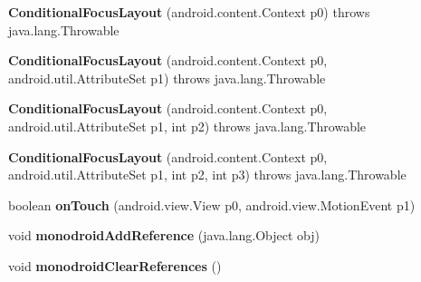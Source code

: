 \begin{DoxyCompactItemize}
\item 
\mbox{\label{classmd5b60ffeb829f638581ab2bb9b1a7f4f3f_1_1_conditional_focus_layout_ab571a4b93e045a68fdbd705da07026b3}} 
{\bfseries Conditional\+Focus\+Layout} (android.\+content.\+Context p0)  throws java.\+lang.\+Throwable 	
\item 
\mbox{\label{classmd5b60ffeb829f638581ab2bb9b1a7f4f3f_1_1_conditional_focus_layout_a3068fc1b02a87f447c1bdd623a7f354c}} 
{\bfseries Conditional\+Focus\+Layout} (android.\+content.\+Context p0, android.\+util.\+Attribute\+Set p1)  throws java.\+lang.\+Throwable 	
\item 
\mbox{\label{classmd5b60ffeb829f638581ab2bb9b1a7f4f3f_1_1_conditional_focus_layout_a73d3de427ee5a3dfdb53afaccc575b96}} 
{\bfseries Conditional\+Focus\+Layout} (android.\+content.\+Context p0, android.\+util.\+Attribute\+Set p1, int p2)  throws java.\+lang.\+Throwable 	
\item 
\mbox{\label{classmd5b60ffeb829f638581ab2bb9b1a7f4f3f_1_1_conditional_focus_layout_a2d591b0b102e0febcc72b7d07ff66429}} 
{\bfseries Conditional\+Focus\+Layout} (android.\+content.\+Context p0, android.\+util.\+Attribute\+Set p1, int p2, int p3)  throws java.\+lang.\+Throwable 	
\item 
\mbox{\label{classmd5b60ffeb829f638581ab2bb9b1a7f4f3f_1_1_conditional_focus_layout_a199b53215336706c0125f8e3b12b1dfc}} 
boolean {\bfseries on\+Touch} (android.\+view.\+View p0, android.\+view.\+Motion\+Event p1)
\item 
\mbox{\label{classmd5b60ffeb829f638581ab2bb9b1a7f4f3f_1_1_conditional_focus_layout_ac7e7b0298a68db5a5b784eb1039ec067}} 
void {\bfseries monodroid\+Add\+Reference} (java.\+lang.\+Object obj)
\item 
\mbox{\label{classmd5b60ffeb829f638581ab2bb9b1a7f4f3f_1_1_conditional_focus_layout_aa7ed542c35e17c2255ffde42f5b0d517}} 
void {\bfseries monodroid\+Clear\+References} ()
\end{DoxyCompactItemize}

